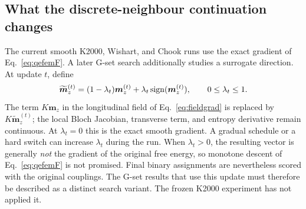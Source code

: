 \subsection{What the discrete-neighbour continuation changes}

The current smooth K2000, Wishart, and Chook runs use the exact gradient of
Eq.~\eqref{eq:qefemF}. A later G-set search additionally studies a
surrogate direction. At update $t$, define
\begin{equation}
 \widetilde{\bm m}_z^{(t)}
 =(1-\lambda_t)\bm m_z^{(t)}
   +\lambda_t\operatorname{sign}(\bm m_z^{(t)}),
 \qquad 0\leq\lambda_t\leq1.
 \label{eq:discretenbr}
\end{equation}
The term $K\bm m_z$ in the longitudinal field of
Eq.~\eqref{eq:fieldgrad} is replaced by
$K\widetilde{\bm m}_z^{(t)}$; the local Bloch Jacobian, transverse term,
and entropy derivative remain continuous. At $\lambda_t=0$ this is the
exact smooth gradient. A gradual schedule or a hard switch can increase
$\lambda_t$ during the run. When $\lambda_t>0$, the resulting vector is
generally \emph{not} the gradient of the original free energy, so
monotone descent of Eq.~\eqref{eq:qefemF} is not promised. Final binary
assignments are nevertheless scored with the original couplings.
The G-set results that use this update must therefore be described as a
distinct search variant. The frozen K2000 experiment has not applied it.
